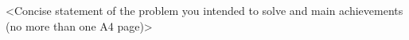 <Concise statement of the problem you intended to solve and main achievements
(no more than one A4 page)>
